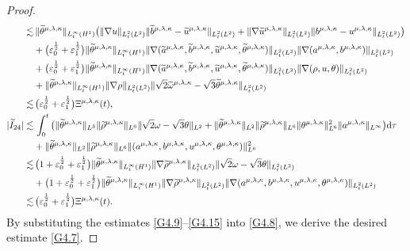 \documentclass[reqno,11pt]{amsart}
\theoremstyle{plain}
\numberwithin{equation}{section}
\newcommand{\eps}{{\varepsilon}}
\begin{document}
\begin{proof}
\begin{align}
\lesssim&\, \|\widetilde{\theta}^{\mu,\lambda,\kappa}\|_{L_t^\infty(H^1)}\big(\|\nabla u\|_{L_t^2(L^2)}\|\widetilde{b}^{\mu,\lambda,\kappa}-\widetilde{u}^{\mu,\lambda,\kappa}\|_{L_t^2(L^2)}+\|\nabla\widetilde{u}^{\mu,\lambda,\kappa}\|_{L_t^2(L^2)}\|b^{\mu,\lambda,\kappa}-u^{\mu,\lambda,\kappa}\|_{L_t^2(L^2)}\big) \nonumber\\
&+\big(\eps_0^\frac{1}{2}+\eps_1^\frac{1}{2}\big)\|\widetilde{\theta}^{\mu,\lambda,\kappa}\|_{L_t^\infty(H^1)} \|\nabla(\widetilde{a}^{\mu,\lambda,\kappa},\widetilde{b}^{\mu,\lambda,\kappa},\widetilde{u}^{\mu,\lambda,\kappa},\widetilde{\theta}^{\mu,\lambda,\kappa})\|_{L_t^2(L^2)}\|\nabla (a^{\mu,\lambda,\kappa},b^{\mu,\lambda,\kappa})\|_{L_t^2(L^2)}\nonumber\\
&+\big(\eps_0^\frac{1}{2}+\eps_1^\frac{1}{2}\big)\|\widetilde{\theta}^{\mu,\lambda,\kappa}\|_{L_t^\infty(H^1)} \|\nabla(\widetilde{a}^{\mu,\lambda,\kappa},\widetilde{b}^{\mu,\lambda,\kappa},\widetilde{u}^{\mu,\lambda,\kappa},\widetilde{\theta}^{\mu,\lambda,\kappa})\|_{L_t^2(L^2)}\|\nabla (\rho,u,\theta)\|_{L_t^2(L^2)} \nonumber\\
&+\|\widetilde{\theta}^{\mu,\lambda,\kappa}\|_{L_t^\infty(H^1)}\|\nabla\rho\|_{L_t^2(L^2)}\|\sqrt{2}\widetilde\omega^{\mu,\lambda,\kappa}-\sqrt{3}\widetilde{\theta}^{\mu,\lambda,\kappa}\|_{L_t^2(L^2)}\nonumber\\
\lesssim&\,\big(\eps_0^\frac{1}{2}+\eps_1^\frac{1}{2}\big){\Xi} ^{\mu,\lambda,\kappa}(t),\label{G4.15-2}\\
|\widetilde{I}_{24}|\lesssim&\,  \int_0^t\big(\|\widetilde{\theta}^{\mu,\lambda,\kappa}\|_{L^3}\|\widetilde{\rho}^{\mu,\lambda,\kappa}\|_{L^6}\|\sqrt{2}\omega-\sqrt{3}\theta\|_{L^2}+\|\widetilde{\theta}^{\mu,\lambda,\kappa}\|_{L^2}\|\widetilde{\rho}^{\mu,\lambda,\kappa}\|_{L^6}\|\theta^{\mu,\lambda,\kappa}\|_{L^6}^2\|a^{\mu,\lambda,\kappa}\|_{L^\infty}\big){\rm d}\tau\nonumber\\
&+\|\widetilde{\theta}^{\mu,\lambda,\kappa}\|_{L^2}\|\widetilde{\rho}^{\mu,\lambda,\kappa}\|_{L^6}\|(a^{\mu,\lambda,\kappa},b^{\mu,\lambda,\kappa},u^{\mu,\lambda,\kappa},\theta^{\mu,\lambda,\kappa})\|_{L^6}^2\nonumber\\
\lesssim&\,\big(1+\eps_0^\frac{1}{2}+\eps_1^\frac{1}{2}\big)\|\widetilde{\theta}^{\mu,\lambda,\kappa}\|_{L_t^\infty(H^1)}\|\nabla\widetilde{\rho}^{\mu,\lambda,\kappa}\|_{L_t^2(L^2)}\|\sqrt{2}\omega-\sqrt{3}\theta\|_{L_t^2(L^2)}\nonumber\\
&+\big(1+\eps_0^\frac{1}{2}+\eps_1^\frac{1}{2}\big)\|\widetilde{\theta}^{\mu,\lambda,\kappa}\|_{L_t^\infty(H^1)}\|\nabla\widetilde{\rho}^{\mu,\lambda,\kappa}\|_{L_t^2(L^2)}\|\nabla(a^{\mu,\lambda,\kappa},b^{\mu,\lambda,\kappa},u^{\mu,\lambda,\kappa},\theta^{\mu,\lambda,\kappa})\|_{L_t^2(L^2)}\nonumber\\
\lesssim&\, \big(\eps_0^\frac{1}{2}+\eps_1^\frac{1}{2}\big){\Xi} ^{\mu,\lambda,\kappa}(t).\label{G4.15}
\end{align} 
By substituting the estimates   \eqref{G4.9}--\eqref{G4.15} into \eqref{G4.8}, we derive the desired estimate 
\eqref{G4.7}.
\end{proof}
\end{document}
